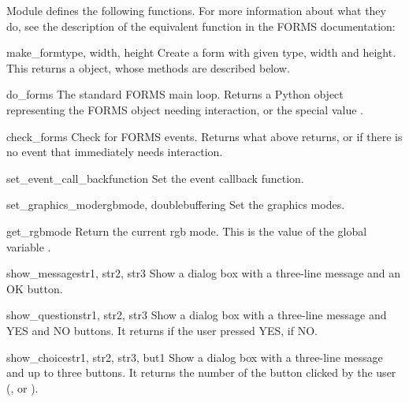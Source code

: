 Module  defines the following functions.  For more
information about what they do, see the description of the equivalent
\C{} function in the FORMS documentation:

\begin{funcdesc}{make_form}{type, width, height}
Create a form with given type, width and height.  This returns a
 object, whose methods are described below.
\end{funcdesc}

\begin{funcdesc}{do_forms}{}
The standard FORMS main loop.  Returns a Python object representing
the FORMS object needing interaction, or the special value
.
\end{funcdesc}

\begin{funcdesc}{check_forms}{}
Check for FORMS events.  Returns what  above
returns, or  if there is no event that immediately needs
interaction.
\end{funcdesc}

\begin{funcdesc}{set_event_call_back}{function}
Set the event callback function.
\end{funcdesc}

\begin{funcdesc}{set_graphics_mode}{rgbmode, doublebuffering}
Set the graphics modes.
\end{funcdesc}

\begin{funcdesc}{get_rgbmode}{}
Return the current rgb mode.  This is the value of the \C{} global
variable .
\end{funcdesc}

\begin{funcdesc}{show_message}{str1, str2, str3}
Show a dialog box with a three-line message and an OK button.
\end{funcdesc}

\begin{funcdesc}{show_question}{str1, str2, str3}
Show a dialog box with a three-line message and YES and NO buttons.
It returns  if the user pressed YES,  if NO.
\end{funcdesc}

\begin{funcdesc}{show_choice}{str1, str2, str3, but1}
Show a dialog box with a three-line message and up to three buttons.
It returns the number of the button clicked by the user
(,  or ).
\end{funcdesc}

